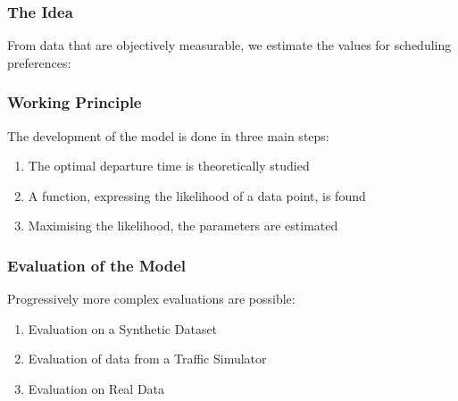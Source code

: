 \documentclass[hyperref={pdfpagelabels=false}]{beamer}
\begin{document}
\begin{frame}
  \frametitle{The Idea}
  From data that are objectively measurable,
  we estimate the values for scheduling preferences:
  
  \begin{figure}
    \centering
  \end{figure}
\end{frame}

\begin{frame}
  \frametitle{Working Principle}
  The development of the model is done in three main steps:
  \begin{enumerate}
  \item<2-> The optimal departure time is theoretically studied
  \item<3-> A function, expressing the likelihood of a data point, is found
  \item<4-> Maximising the likelihood, the parameters are estimated
  \end{enumerate}
\end{frame}

\begin{frame}
  \frametitle{Evaluation of the Model}
  Progressively more complex evaluations are possible:
  \begin{enumerate}
  \item<2-> Evaluation on a Synthetic Dataset
  \item<2-> Evaluation of data from a Traffic Simulator
  \item<2-> Evaluation on Real Data
  \end{enumerate}
\end{frame}
\end{document}

